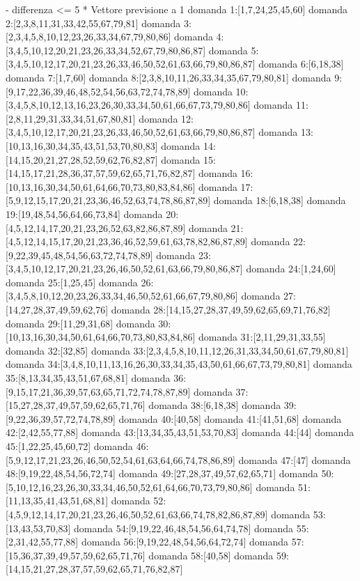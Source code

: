 - differenza <= 5
* Vettore previsione a 1
domanda 1:[1,7,24,25,45,60]
domanda 2:[2,3,8,11,31,33,42,55,67,79,81]
domanda 3:[2,3,4,5,8,10,12,23,26,33,34,67,79,80,86]
domanda 4:[3,4,5,10,12,20,21,23,26,33,34,52,67,79,80,86,87]
domanda 5:[3,4,5,10,12,17,20,21,23,26,33,46,50,52,61,63,66,79,80,86,87]
domanda 6:[6,18,38]
domanda 7:[1,7,60]
domanda 8:[2,3,8,10,11,26,33,34,35,67,79,80,81]
domanda 9:[9,17,22,36,39,46,48,52,54,56,63,72,74,78,89]
domanda 10:[3,4,5,8,10,12,13,16,23,26,30,33,34,50,61,66,67,73,79,80,86]
domanda 11:[2,8,11,29,31,33,34,51,67,80,81]
domanda 12:[3,4,5,10,12,17,20,21,23,26,33,46,50,52,61,63,66,79,80,86,87]
domanda 13:[10,13,16,30,34,35,43,51,53,70,80,83]
domanda 14:[14,15,20,21,27,28,52,59,62,76,82,87]
domanda 15:[14,15,17,21,28,36,37,57,59,62,65,71,76,82,87]
domanda 16:[10,13,16,30,34,50,61,64,66,70,73,80,83,84,86]
domanda 17:[5,9,12,15,17,20,21,23,36,46,52,63,74,78,86,87,89]
domanda 18:[6,18,38]
domanda 19:[19,48,54,56,64,66,73,84]
domanda 20:[4,5,12,14,17,20,21,23,26,52,63,82,86,87,89]
domanda 21:[4,5,12,14,15,17,20,21,23,36,46,52,59,61,63,78,82,86,87,89]
domanda 22:[9,22,39,45,48,54,56,63,72,74,78,89]
domanda 23:[3,4,5,10,12,17,20,21,23,26,46,50,52,61,63,66,79,80,86,87]
domanda 24:[1,24,60]
domanda 25:[1,25,45]
domanda 26:[3,4,5,8,10,12,20,23,26,33,34,46,50,52,61,66,67,79,80,86]
domanda 27:[14,27,28,37,49,59,62,76]
domanda 28:[14,15,27,28,37,49,59,62,65,69,71,76,82]
domanda 29:[11,29,31,68]
domanda 30:[10,13,16,30,34,50,61,64,66,70,73,80,83,84,86]
domanda 31:[2,11,29,31,33,55]
domanda 32:[32,85]
domanda 33:[2,3,4,5,8,10,11,12,26,31,33,34,50,61,67,79,80,81]
domanda 34:[3,4,8,10,11,13,16,26,30,33,34,35,43,50,61,66,67,73,79,80,81]
domanda 35:[8,13,34,35,43,51,67,68,81]
domanda 36:[9,15,17,21,36,39,57,63,65,71,72,74,78,87,89]
domanda 37:[15,27,28,37,49,57,59,62,65,71,76]
domanda 38:[6,18,38]
domanda 39:[9,22,36,39,57,72,74,78,89]
domanda 40:[40,58]
domanda 41:[41,51,68]
domanda 42:[2,42,55,77,88]
domanda 43:[13,34,35,43,51,53,70,83]
domanda 44:[44]
domanda 45:[1,22,25,45,60,72]
domanda 46:[5,9,12,17,21,23,26,46,50,52,54,61,63,64,66,74,78,86,89]
domanda 47:[47]
domanda 48:[9,19,22,48,54,56,72,74]
domanda 49:[27,28,37,49,57,62,65,71]
domanda 50:[5,10,12,16,23,26,30,33,34,46,50,52,61,64,66,70,73,79,80,86]
domanda 51:[11,13,35,41,43,51,68,81]
domanda 52:[4,5,9,12,14,17,20,21,23,26,46,50,52,61,63,66,74,78,82,86,87,89]
domanda 53:[13,43,53,70,83]
domanda 54:[9,19,22,46,48,54,56,64,74,78]
domanda 55:[2,31,42,55,77,88]
domanda 56:[9,19,22,48,54,56,64,72,74]
domanda 57:[15,36,37,39,49,57,59,62,65,71,76]
domanda 58:[40,58]
domanda 59:[14,15,21,27,28,37,57,59,62,65,71,76,82,87]
